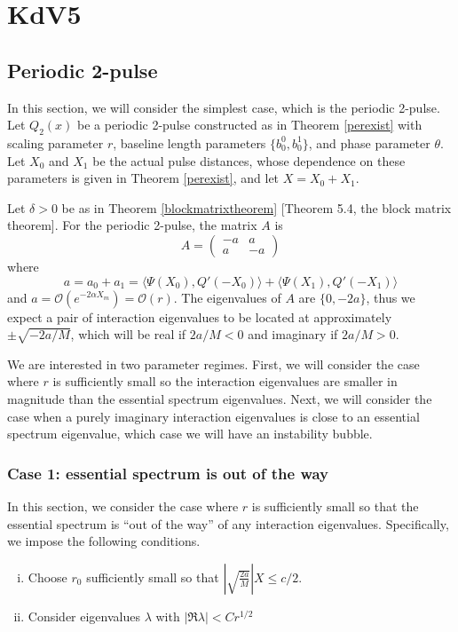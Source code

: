 \documentclass[thesis.tex]{subfiles}
\begin{document}
\chapter{KdV5}

\section{Periodic 2-pulse}

In this section, we will consider the simplest case, which is the periodic 2-pulse. Let $Q_2(x)$ be a periodic 2-pulse constructed as in Theorem \ref{perexist} with scaling parameter $r$, baseline length parameters $\{b_0^0, b_0^1\}$, and phase parameter $\theta$. Let $X_0$ and $X_1$ be the actual pulse distances, whose dependence on these parameters is given in Theorem \ref{perexist}, and let $X = X_0 + X_1$.  

Let $\delta > 0$ be as in Theorem \ref{blockmatrixtheorem} [Theorem 5.4, the block matrix theorem]. For the periodic 2-pulse, the matrix $A$ is
\[
A = \begin{pmatrix}
-a & a \\
a & -a
\end{pmatrix}
\]
where
\[
a = a_0 + a_1 = \langle \Psi(X_0), Q'(-X_0) \rangle + \langle \Psi(X_1), Q'(-X_1) \rangle
\]
and $a = \mathcal{O}(e^{-2\alpha X_m}) = \mathcal{O}(r)$. The eigenvalues of $A$ are $\{0, -2a\}$, thus we expect a pair of interaction eigenvalues to be located at approximately $\pm \sqrt{-2a/M}$, which will be real if $2a/M < 0$ and imaginary if $2a/M > 0$. 

We are interested in two parameter regimes. First, we will consider the case where $r$ is sufficiently small so the interaction eigenvalues are smaller in magnitude than the essential spectrum eigenvalues. Next, we will consider the case when a purely imaginary interaction eigenvalues is close to an essential spectrum eigenvalue, which case we will have an instability bubble.

\subsection{Case 1: essential spectrum is out of the way}

In this section, we consider the case where $r$ is sufficiently small so that the essential spectrum is ``out of the way'' of any interaction eigenvalues. Specifically, we impose the following conditions.

\begin{enumerate}[(i)]
	\item Choose $r_0$ sufficiently small so that
	$\left| \sqrt{\frac{2a}{M}} \right| X \leq c/2$.
	\item Consider eigenvalues $\lambda$ with $|\Re \lambda| < C r^{1/2}$
\end{enumerate}
\end{document}
